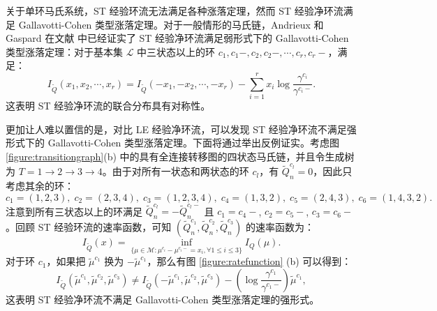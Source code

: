 
关于单环马氏系统，ST 经验环流无法满足各种涨落定理，然而 ST 经验净环流满足 Gallavotti-Cohen 类型涨落定理。对于一般情形的马氏链，Andrieux 和 Gaspard 在文献 \cite{andrieux2007fluctuation} 中已经证实了 ST 经验净环流满足弱形式下的 Gallavotti-Cohen 类型涨落定理：对于基本集 $\mathcal{L}$ 中三状态以上的环  $c_1,c_1-,c_2,c_2-,\cdots,c_r,c_r-$，满足：
\begin{equation*}
I_{\tilde{Q}}(x_1,x_2,\cdots,x_r)
= I_{\tilde{Q}}(-x_1,-x_2,\cdots,-x_r)
-\sum_{i=1}^rx_i\log\frac{\gamma^{c_i}}{\gamma^{c_i-}}.
\end{equation*}
这表明 ST 经验净环流的联合分布具有对称性。

更加让人难以置信的是，对比 LE 经验净环流，可以发现 ST 经验净环流不满足强形式下的 Gallavotti-Cohen 类型涨落定理。下面将通过举出反例证实。考虑图 \ref{figure:transitiongraph}(b) 中的具有全连接转移图的四状态马氏链，并且令生成树为 $T=1\to2\to3\to4$。由于对所有一状态和两状态的环 $c_l$，有 $\tilde{Q}^{c_l}_n=0$，因此只考虑其余的环：
\begin{equation*}
	c_1 = (1,2,3),\;c_2 = (2,3,4),\;c_3 = (1,2,3,4),\;c_4 = (1,3,2),\;
	c_5 = (2,4,3),\;c_6 = (1,4,3,2).
\end{equation*}
注意到所有三状态以上的环满足 $\tilde{Q}^{c_l}_n=-\tilde{Q}^{c_l-}_n$ 且 $c_1=c_4-$, $c_2=c_5-$, $c_3=c_6-$。回顾 ST 经验环流的速率函数，可知 $(\tilde{Q}^{c_1}_n,\tilde{Q}^{c_2}_n,\tilde{Q}^{c_3}_n)$ 的速率函数为：
\begin{equation*}
	I_{\tilde{Q}}(x)=\inf_{\{\mu\in\mathcal{M}:\mu^{c_i}-\mu^{c_i-}= x_i,\forall 1\le i\le 3\}}I_Q(\mu).
\end{equation*}
对于环 $c_1$，如果把 $\tilde{\mu}^{c_1}$ 换为 $-\tilde{\mu}^{c_1}$，那么有图 \ref{figure:ratefunction} (b) 可以得到：
\begin{equation*}
I_{\tilde{Q}}(\tilde{\mu}^{c_1},\tilde{\mu}^{c_2},\tilde{\mu}^{c_3})\neq I_{\tilde{Q}}(-\tilde{\mu}^{c_1},\tilde{\mu}^{c_2},\tilde{\mu}^{c_3})
-\left(\log\frac{\gamma^{c_1}}{\gamma^{c_1-}}\right)\tilde{\mu}^{c_1},
\end{equation*}
这表明 ST 经验净环流不满足 Gallavotti-Cohen 类型涨落定理的强形式。